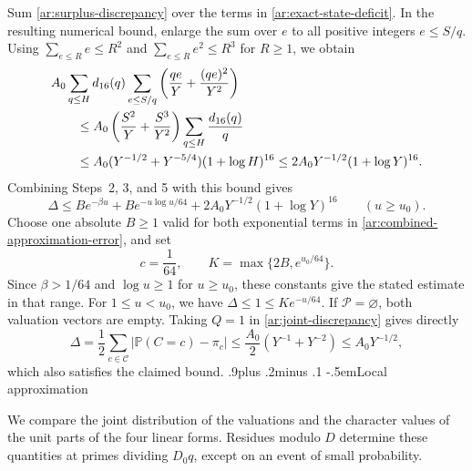 \documentclass[twoside]{aomart}
\makeatletter
\theoremstyle{paperplain}
\theoremstyle{paperdefinition}
\renewcommand\subsection{\@startsection{subsection}{2}{\z@}
  {.9\baselineskip plus .2\baselineskip minus .1\baselineskip}
  {-.5em}{\normalfont\bfseries}}
\renewenvironment{proof}[1][\proofname]{\par\pushQED{\qed}%
  \normalfont\topsep6\p@\@plus3\p@\relax\trivlist
  \item[\hskip\labelsep\itshape #1\@addpunct{.}]\ignorespaces
}{\popQED\endtrivlist\@endpefalse}
\newcommand{\Pp}{\mathbb P}
\numberwithin{equation}{section}
\makeatother
\begin{document}
\begin{proof}
Sum \eqref{ar:surplus-discrepancy} over the terms in
\eqref{ar:exact-state-deficit}. In the resulting numerical bound,
enlarge the sum over $e$ to all positive integers $e\le S/q$.
Using $\sum_{e\le R}e\le R^2$ and $\sum_{e\le R}e^2\le R^3$
for $R\ge1$, we obtain
\begin{align*}
 &A_0\sum_{q\le H}d_{16}(q)
       \sum_{e\le S/q}\left(\frac{qe}{Y}+\frac{(qe)^2}{Y^2}\right)\notag\\
 &\qquad\le A_0\left(\frac{S^2}{Y}+\frac{S^3}{Y^2}\right)
                \sum_{q\le H}\frac{d_{16}(q)}q\notag\\
 &\qquad\le A_0(Y^{-1/2}+Y^{-5/4})(1+\log H)^{16}
 \le2A_0Y^{-1/2}(1+\log Y)^{16}.
\end{align*}
Combining Steps~2, 3, and 5 with this bound gives
\begin{equation}
 \Delta\le Be^{-\beta u}+Be^{-u\log u/64}
          +2A_0Y^{-1/2}(1+\log Y)^{16}\qquad(u\ge u_0).
 \label{ar:combined-approximation-error}
\end{equation}
Choose one absolute $B\ge1$ valid for both exponential terms
in \eqref{ar:combined-approximation-error}, and set
\begin{equation*}
 c=\frac1{64},\qquad K=\max\{2B,e^{u_0/64}\}.
 \end{equation*}
Since $\beta>1/64$ and $\log u\ge1$ for $u\ge u_0$,
these constants give the stated estimate in that range.
For $1\le u<u_0$, we have $\Delta\le1\le Ke^{-u/64}$.
If $\mathcal P=\varnothing$, both valuation vectors are empty.
Taking $Q=1$ in \eqref{ar:joint-discrepancy} gives directly
\begin{equation*}
 \Delta=\frac12\sum_{c\in\mathcal C}|\Pp(C=c)-\pi_c|
 \le\frac{A_0}{2}(Y^{-1}+Y^{-2})\le A_0Y^{-1/2},
 \end{equation*}
which also satisfies the claimed bound.
\end{proof}
\subsection{Local approximation}

We compare the joint distribution of the valuations and the character
values of the unit parts of the four linear forms.
Residues modulo $D$ determine these quantities at primes dividing
$D_0q$, except on an event of small probability.
\end{document}
